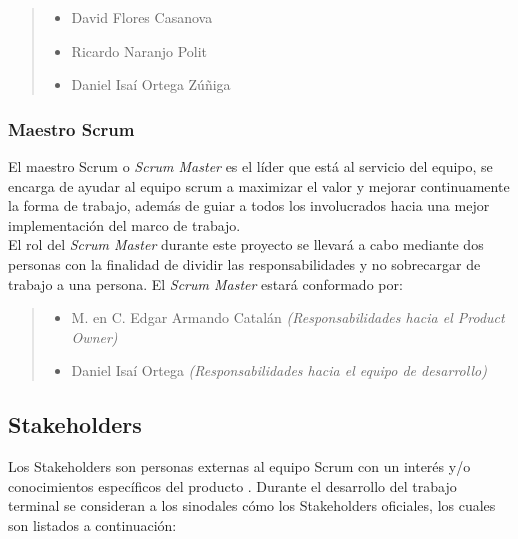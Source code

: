         
    \begin{quote}
    \begin{itemize}
        \item David Flores Casanova
        \item Ricardo Naranjo Polit
        \item Daniel Isaí Ortega Zúñiga
    \end{itemize}
    \end{quote}

\subsubsection{Maestro Scrum}

 El maestro Scrum o {\it Scrum Master} es el líder que está al servicio del equipo,
 se encarga de ayudar al equipo scrum a maximizar el valor y mejorar continuamente la
 forma de trabajo, además de guiar a todos los involucrados hacia una mejor implementación
 del marco de trabajo.\\

 \noindent El rol del {\it Scrum Master} durante este proyecto se llevará a cabo mediante
 dos personas con la finalidad de dividir las responsabilidades y no sobrecargar de trabajo
 a una persona. El {\it Scrum Master} estará conformado por:

    \begin{quote}
    \begin{itemize}
        \item M. en C. Edgar Armando Catalán {\it (Responsabilidades hacia el Product Owner)}
        \item Daniel Isaí Ortega {\it(Responsabilidades hacia el equipo de desarrollo)}
    \end{itemize}                        
    \end{quote}

\subsection{Stakeholders}

 Los Stakeholders son personas externas al equipo Scrum con un interés y/o conocimientos
 específicos del producto \cite{ScrumGlosary}. Durante el desarrollo del trabajo terminal
 se consideran a los sinodales cómo los Stakeholders oficiales, los cuales son listados a
 continuación:

